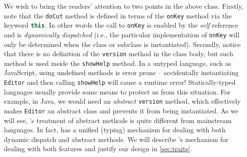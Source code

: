 We wish to bring the readers' attention to two points in the above class.
Firstly, note that the \lstinline{doCut} method is defined in terms of the
\lstinline{onKey} method via the keyword
\lstinline[language=JavaScript]{this}. In other words the call to
\lstinline{onKey} is enabled by the \emph{self} reference and is
\emph{dynamically dispatched} (i.e., the particular implementation of
\lstinline{onKey} will only be determined when the class or subclass
is instantiated). %
Secondly, notice that there is no definition of
the \lstinline{version} method in the class body, but such method is used inside the
\lstinline{showHelp} method. In a untyped language, such as JavaScript, using
undefined methods is error prone -- accidentally instantiating \lstinline{Editor}
and then calling \lstinline{showHelp} will cause a runtime error!
Statically-typed languages usually provide some means to protect us from this
situation. For example, in Java, we would need an \textit{abstract} \lstinline{version}
method, which effectively makes \lstinline{Editor} an abstract class and
prevents it from being instantiated. As we will see, \sedel's treatment of
abstract methods is quite different from mainstream languages. In fact, \sedel
has a unified (typing) mechanism for dealing with both dynamic dispatch and abstract
methods. We will describe \sedel's mechanism for dealing with both features and
justify our design in \cref{sec:traits}.


